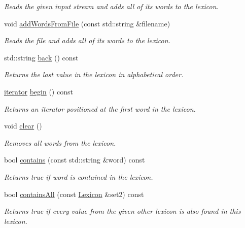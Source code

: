 \begin{DoxyCompactItemize}
\begin{DoxyCompactList}\small\item\em Reads the given input stream and adds all of its words to the lexicon. \end{DoxyCompactList}\item 
void \mbox{\hyperlink{classLexicon_a3891deaa85aee9a52b6ca258d1514716}{add\+Words\+From\+File}} (const std\+::string \&filename)
\begin{DoxyCompactList}\small\item\em Reads the file and adds all of its words to the lexicon. \end{DoxyCompactList}\item 
std\+::string \mbox{\hyperlink{classLexicon_a324ff6b85a0d392036efefc95b5d5e83}{back}} () const
\begin{DoxyCompactList}\small\item\em Returns the last value in the lexicon in alphabetical order. \end{DoxyCompactList}\item 
\mbox{\hyperlink{classLexicon_1_1iterator}{iterator}} \mbox{\hyperlink{classLexicon_a0c62c15c8ed609e7e5e9518cf5f5c712}{begin}} () const
\begin{DoxyCompactList}\small\item\em Returns an iterator positioned at the first word in the lexicon. \end{DoxyCompactList}\item 
void \mbox{\hyperlink{classLexicon_ac8bb3912a3ce86b15842e79d0b421204}{clear}} ()
\begin{DoxyCompactList}\small\item\em Removes all words from the lexicon. \end{DoxyCompactList}\item 
bool \mbox{\hyperlink{classLexicon_a479b1bac4a3c243907c80e5c6f9b05d5}{contains}} (const std\+::string \&word) const
\begin{DoxyCompactList}\small\item\em Returns {\ttfamily true} if {\ttfamily word} is contained in the lexicon. \end{DoxyCompactList}\item 
bool \mbox{\hyperlink{classLexicon_a9cc56f4fc1106ca74a59fceb9d68b3e9}{contains\+All}} (const \mbox{\hyperlink{classLexicon}{Lexicon}} \&set2) const
\begin{DoxyCompactList}\small\item\em Returns {\ttfamily true} if every value from the given other lexicon is also found in this lexicon. \end{DoxyCompactList}\item 

\end{DoxyCompactItemize}
